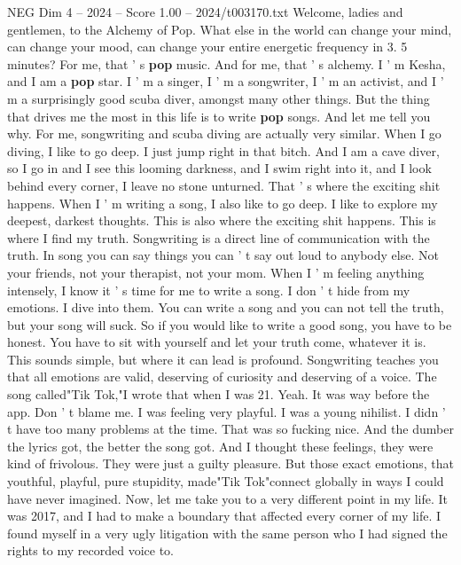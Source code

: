 \begin{textsample}{NEG Dim 4 – 2024 – Score 1.00 – 2024/t003170.txt}  \label{ex:f4_neg_075}
Welcome, ladies and gentlemen, to the Alchemy of Pop.
What else in the world can change your mind, can change your mood, can change your entire energetic frequency in 3. 5 minutes?
For me, that ' s \textbf{pop} music.
And for me, that ' s alchemy.
I ' m Kesha, and I am a \textbf{pop} star.
I ' m a singer, I ' m a songwriter, I ' m an activist, and I ' m a surprisingly good scuba diver, amongst many other things.
But the thing that drives me the most in this life is to write \textbf{pop} songs.
And let me tell you why.
For me, songwriting and scuba diving are actually very similar.
When I go diving, I like to go deep.
I just jump right in that bitch.
And I am a cave diver, so I go in and I see this looming darkness, and I swim right into it, and I look behind every corner, I leave no stone unturned.
That ' s where the exciting shit happens.
When I ' m writing a song, I also like to go deep.
I like to explore my deepest, darkest thoughts.
This is also where the exciting shit happens.
This is where I find my truth.
Songwriting is a direct line of communication with the truth.
In song you can say things you can ' t say out loud to anybody else.
Not your friends, not your therapist, not your mom.
When I ' m feeling anything intensely, I know it ' s time for me to write a song.
I don ' t hide from my emotions.
I dive into them.
You can write a song and you can not tell the truth, but your song will suck.
So if you would like to write a good song, you have to be honest.
You have to sit with yourself and let your truth come, whatever it is.
This sounds simple, but where it can lead is profound.
Songwriting teaches you that all emotions are valid, deserving of curiosity and deserving of a voice.
The song called"Tik Tok,"I wrote that when I was 21.
Yeah.
It was way before the app.
Don ' t blame me.
I was feeling very playful.
I was a young nihilist.
I didn ' t have too many problems at the time.
That was so fucking nice.
And the dumber the lyrics got, the better the song got.
And I thought these feelings, they were kind of frivolous.
They were just a guilty pleasure.
But those exact emotions, that youthful, playful, pure stupidity, made"Tik Tok"connect globally in ways I could have never imagined.
Now, let me take you to a very different point in my life.
It was 2017, and I had to make a boundary that affected every corner of my life.
I found myself in a very ugly litigation with the same person who I had signed the rights to my recorded voice to.

\end{textsample}
